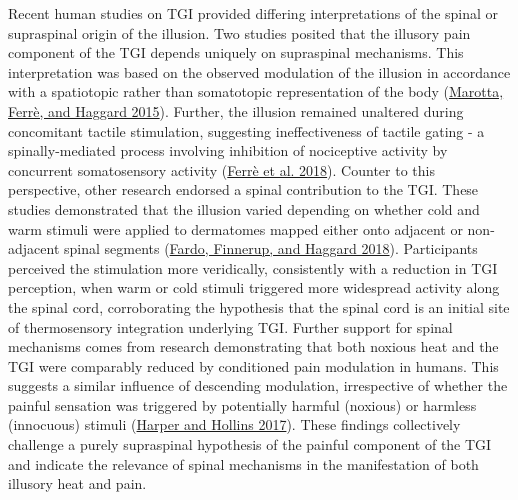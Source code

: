 \documentclass[
]{article}
\begin{document}
Recent human studies on TGI provided differing interpretations of the
spinal or supraspinal origin of the illusion. Two studies posited that
the illusory pain component of the TGI depends uniquely on supraspinal
mechanisms. This interpretation was based on the observed modulation of
the illusion in accordance with a spatiotopic rather than somatotopic
representation of the body
(\protect\hyperlink{ref-marotta_transforming_2015}{Marotta, Ferrè, and
Haggard 2015}). Further, the illusion remained unaltered during
concomitant tactile stimulation, suggesting ineffectiveness of tactile
gating - a spinally-mediated process involving inhibition of nociceptive
activity by concurrent somatosensory activity
(\protect\hyperlink{ref-ferre_ineffectiveness_2018}{Ferrè et al. 2018}).
Counter to this perspective, other research endorsed a spinal
contribution to the TGI. These studies demonstrated that the illusion
varied depending on whether cold and warm stimuli were applied to
dermatomes mapped either onto adjacent or non-adjacent spinal segments
(\protect\hyperlink{ref-fardo_organization_2018}{Fardo, Finnerup, and
Haggard 2018}). Participants perceived the stimulation more veridically,
consistently with a reduction in TGI perception, when warm or cold
stimuli triggered more widespread activity along the spinal cord,
corroborating the hypothesis that the spinal cord is an initial site of
thermosensory integration underlying TGI. Further support for spinal
mechanisms comes from research demonstrating that both noxious heat and
the TGI were comparably reduced by conditioned pain modulation in
humans. This suggests a similar influence of descending modulation,
irrespective of whether the painful sensation was triggered by
potentially harmful (noxious) or harmless (innocuous) stimuli
(\protect\hyperlink{ref-harper_conditioned_2017}{Harper and Hollins
2017}). These findings collectively challenge a purely supraspinal
hypothesis of the painful component of the TGI and indicate the
relevance of spinal mechanisms in the manifestation of both illusory
heat and pain.
\end{document}
